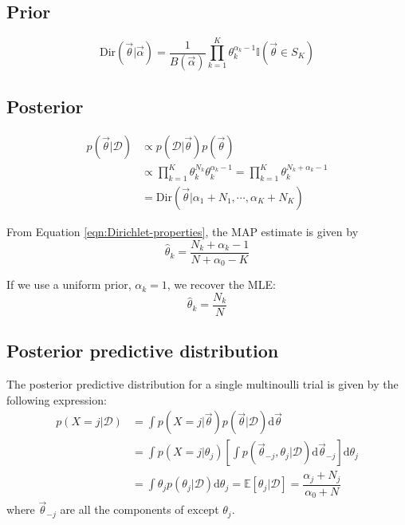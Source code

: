 \subsection{Prior}
\begin{equation}
\text{Dir}(\vec{\theta}|\vec{\alpha}) = \dfrac{1}{B(\vec{\alpha})}\prod\limits_{k=1}^K \theta_k^{\alpha_k-1}\mathbb{I}(\vec{\theta} \in S_K)
\end{equation}


\subsection{Posterior}
\begin{align}
p(\vec{\theta}|\mathcal{D})& \propto p(\mathcal{D}|\vec{\theta})p(\vec{\theta}) \\
     & \propto \prod\limits_{k=1}^K\theta_k^{N_k}\theta_k^{\alpha_k-1} = \prod\limits_{k=1}^K\theta_k^{N_k+\alpha_k-1}\\
	 & =\text{Dir}(\vec{\theta}|\alpha_1+N_1,\cdots,\alpha_K+N_K)
\end{align}

From Equation \eqref{eqn:Dirichlet-properties}, the MAP estimate is given by
\begin{equation}\label{eqn:Dir-MAP}
\hat{\theta}_k=\dfrac{N_k+\alpha_k-1}{N+\alpha_0-K}
\end{equation}

If we use a uniform prior, $\alpha_k=1$, we recover the MLE:
\begin{equation}\label{eqn:Dirichlet-multinomial-posterior-MLE}
\hat{\theta}_k=\dfrac{N_k}{N}
\end{equation}


\subsection{Posterior predictive distribution}
The posterior predictive distribution for a single multinoulli trial is given by the following expression:
\begin{align}
p(X=j|\mathcal{D})& =\int p(X=j|\vec{\theta})p(\vec{\theta}|\mathcal{D})\mathrm{d}\vec{\theta} \\
    & =\int p(X=j|\theta_j)\left[\int p(\vec{\theta}_{-j}, \theta_j|\mathcal{D})\mathrm{d}\vec{\theta}_{-j}\right]\mathrm{d}\theta_j \\
	& =\int \theta_jp(\theta_j|\mathcal{D})\mathrm{d}\theta_j=\mathbb{E}[\theta_j|\mathcal{D}]=\dfrac{\alpha_j+N_j}{\alpha_0+N}
\end{align}
where $\vec{\theta}_{-j}$ are all the components of \vec{\theta} except $\theta_j$.

